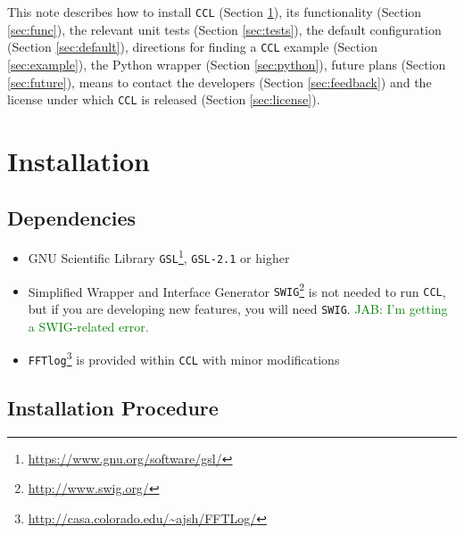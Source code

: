 \documentclass[\docopts]{\docclass}
\newcommand{\jab}[1]{\textcolor{green}{JAB: #1}}
\begin{document}
This note describes how to install {\tt CCL} (Section \ref{sec:install}), its functionality (Section \ref{sec:func}), the relevant unit tests (Section \ref{sec:tests}), the default configuration (Section \ref{sec:default}), directions for finding a {\tt CCL} example (Section \ref{sec:example}), the Python wrapper (Section \ref{sec:python}), future plans (Section \ref{sec:future}), means to contact the developers (Section \ref{sec:feedback}) and the license under which {\tt CCL} is released (Section \ref{sec:license}).


\section{Installation}
\label{sec:install}

\subsection{Dependencies}

\begin{itemize}
\item GNU Scientific Library {\tt GSL}\footnote{\url{https://www.gnu.org/software/gsl/}}, {\tt GSL-2.1} or higher
\item Simplified Wrapper and Interface Generator {\tt SWIG}\footnote{\url{http://www.swig.org/}} is not needed to run {\tt CCL}, but if you are developing new features, you will need {\tt SWIG}. \jab{I'm getting a SWIG-related error.}
\item {\tt FFTlog}\footnote{\url{http://casa.colorado.edu/~ajsh/FFTLog/}} is provided within {\tt CCL} with minor modifications 
\end{itemize}

\subsection{Installation Procedure}
\end{document}
